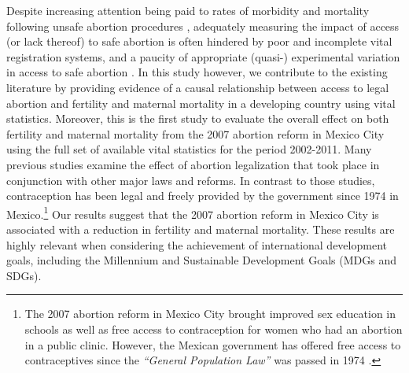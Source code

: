 \documentclass[a4paper, 11pt]{article}
\begin{document}
\begin{spacing}{2}
Despite increasing attention being paid to rates of morbidity and mortality following unsafe abortion procedures \citep{Grimes2006,Brown2007,Kulczycki2011}, adequately measuring the impact of access (or lack thereof) to safe abortion is often hindered by poor and incomplete vital registration systems, and a paucity of appropriate (quasi-) experimental variation in access to safe abortion \citep{Grimes2006}. In this study however, we contribute to the existing literature by providing evidence of a causal relationship between access to legal abortion and fertility and maternal mortality in a developing country using vital statistics. Moreover, this is the first study to evaluate the overall effect on both fertility and maternal mortality from the 2007 abortion reform in Mexico City using the full set of available vital statistics for the period 2002-2011. Many previous studies examine the effect of abortion legalization that took place in conjunction with other major laws and reforms. In contrast to those studies, contraception has been legal and freely provided by the government since 1974 in Mexico.\footnote{The 2007 abortion reform in Mexico City brought improved sex education in schools as well as free access to contraception for women who had an abortion in a public clinic. However, the Mexican government has offered free access to contraceptives since the \textit{``General Population Law''} was passed in 1974 \citep{GIRE2009}.} Our results suggest that the 2007 abortion reform in Mexico City is associated with a reduction in fertility and maternal mortality. These results are highly relevant when considering the achievement of international development goals, including the Millennium and Sustainable Development Goals (MDGs and SDGs).



\end{spacing}
\end{document}
